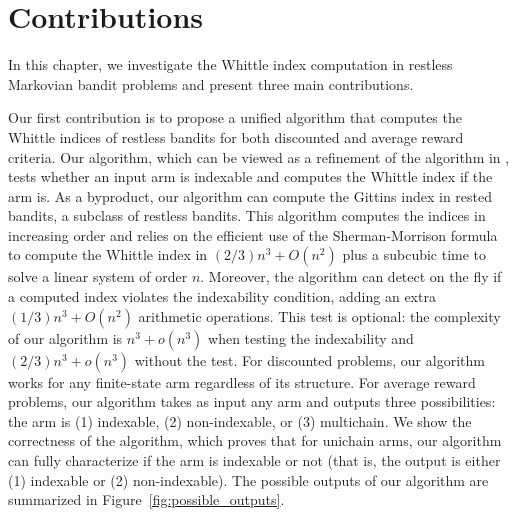 \section{Contributions}
\label{ch:cpt:sec:contribute}

In this chapter, we investigate the Whittle index computation in restless Markovian bandit problems and present three main contributions. 

Our first contribution is to propose a unified algorithm that computes the Whittle indices of restless bandits for both discounted and average reward criteria. Our algorithm, which can be viewed as a refinement of the algorithm in \cite{akbarzadeh2020conditions}, tests whether an input arm is indexable and computes the Whittle index if the arm is. As a byproduct, our algorithm can compute the Gittins index in rested bandits, a subclass of restless bandits. This algorithm computes the indices in increasing order and relies on the efficient use of the Sherman-Morrison formula to compute the Whittle index in $(2/3)n^3 + O(n^2)$ plus a subcubic time \cite{strassen1969gaussian} to solve a linear system of order $n$.
Moreover, the algorithm can detect on the fly if a computed index violates the indexability condition, adding an extra $(1/3)n^3+O(n^2)$ arithmetic operations. This test is optional: the complexity of our algorithm is $n^3+o(n^3)$ when testing the indexability and $(2/3)n^3 +o(n^3)$ without the test. For discounted problems, our algorithm works for any finite-state arm regardless of its structure. For average reward problems, our algorithm takes as input any arm and outputs three possibilities: the arm is (1) indexable, (2) non-indexable, or (3) multichain. %
We show the correctness of the algorithm, which proves that for unichain arms, our algorithm can fully characterize if the arm is indexable or not (that is, the output is either (1) indexable or (2) non-indexable). The possible outputs of our algorithm are summarized in Figure~\ref{fig:possible_outputs}.

